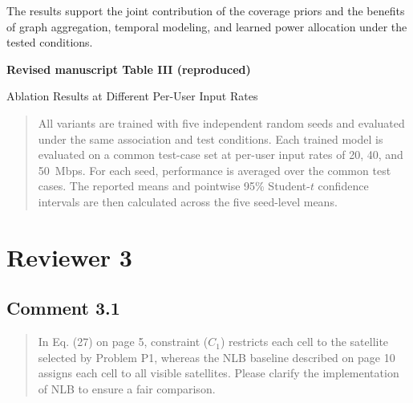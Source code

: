 \documentclass[11pt,a4paper]{article}
\begin{document}
The results support the joint contribution of the coverage priors and the benefits of graph aggregation, temporal modeling, and learned power allocation under the tested conditions.
\par

\par{}\begin{center}\begin{minipage}{\linewidth}\centering
{\small\textbf{Revised manuscript Table III (reproduced)}\par Ablation Results at Different Per-User Input Rates\par}
\vspace{0.5em}

\end{minipage}\end{center}


\begin{quote}\small\color{revisionblue}
All variants are trained with five independent random seeds and evaluated under the same association and test conditions. Each trained model is evaluated on a common test-case set at per-user input rates of 20, 40, and 50~Mbps. For each seed, performance is averaged over the common test cases. The reported means and pointwise 95\% Student-$t$ confidence intervals are then calculated across the five seed-level means.
\par
\end{quote}


\clearpage\section*{Reviewer 3}

\subsection*{Comment 3.1}

\begin{quote}\small In Eq. (27) on page 5, constraint ($C_1$) restricts each cell to the satellite selected by Problem P1, whereas the NLB baseline described on page 10 assigns each cell to all visible satellites. Please clarify the implementation of NLB to ensure a fair comparison.\end{quote}
\end{document}
